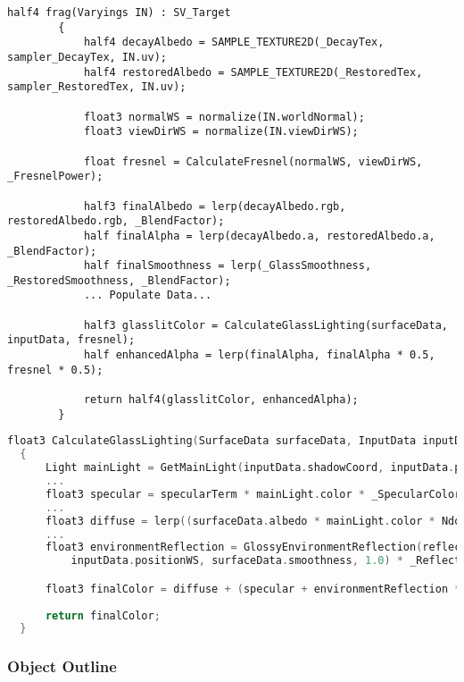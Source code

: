 \begin{lstlisting}[language=HLSL, caption={Partial Fragment shader for blending original and restored textures.}, label={lst:shader_blend},float]
        half4 frag(Varyings IN) : SV_Target
        {
            half4 decayAlbedo = SAMPLE_TEXTURE2D(_DecayTex, sampler_DecayTex, IN.uv);
            half4 restoredAlbedo = SAMPLE_TEXTURE2D(_RestoredTex, sampler_RestoredTex, IN.uv);

            float3 normalWS = normalize(IN.worldNormal);
            float3 viewDirWS = normalize(IN.viewDirWS);

            float fresnel = CalculateFresnel(normalWS, viewDirWS, _FresnelPower);

            half3 finalAlbedo = lerp(decayAlbedo.rgb, restoredAlbedo.rgb, _BlendFactor);
            half finalAlpha = lerp(decayAlbedo.a, restoredAlbedo.a, _BlendFactor);
            half finalSmoothness = lerp(_GlassSmoothness, _RestoredSmoothness, _BlendFactor);
            ... Populate Data...
            
            half3 glasslitColor = CalculateGlassLighting(surfaceData, inputData, fresnel);            
            half enhancedAlpha = lerp(finalAlpha, finalAlpha * 0.5, fresnel * 0.5);
            
            return half4(glasslitColor, enhancedAlpha);
        }
\end{lstlisting}


\begin{lstlisting}[language=C++, caption={Lighting Glass Texture Partial Calculation.}, label={lst:lighting_glass},float]
  float3 CalculateGlassLighting(SurfaceData surfaceData, InputData inputData, float fresnel)
  {
      Light mainLight = GetMainLight(inputData.shadowCoord, inputData.positionWS, inputData.shadowMask);
      ...
      float3 specular = specularTerm * mainLight.color * _SpecularColor.rgb * surfaceData.smoothness;
      ...
      float3 diffuse = lerp((surfaceData.albedo * mainLight.color * NdotL * 0.1),surfaceData.albedo, _BlendFactor);
      ...     
      float3 environmentReflection = GlossyEnvironmentReflection(reflectionVector, 
          inputData.positionWS, surfaceData.smoothness, 1.0) * _ReflectionIntensity;

      float3 finalColor = diffuse + (specular + environmentReflection * fresnel);
      
      return finalColor;
  }
\end{lstlisting}

\subsubsection{Object Outline}
\label{sec:object_outline}

